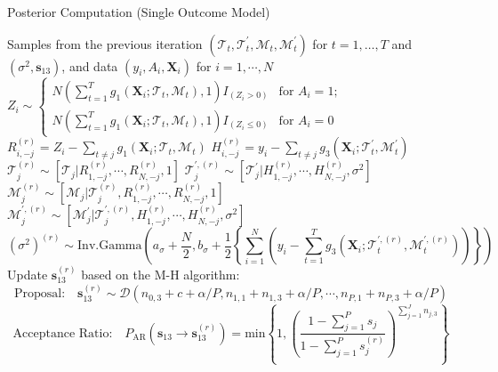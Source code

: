  \begin{algorithm}
\caption{Posterior Computation (Single Outcome Model)}\label{alg:single}
\begin{algorithmic}[1]
\Require Samples from the previous iteration $(\mathcal{T}_t, \mathcal{T}^\prime_t,\mathcal{M}_t,\mathcal{M}_t^\prime)$ for $t=1, \ldots, T$ and $(\sigma^2, \boldsymbol{s}_{13})$, and data $(y_i, A_i, \boldsymbol{X}_i)$ for $i=1, \cdots, N$
\State $Z_i \sim \left\{ \begin{array}{ll}
         N\left(\sum_{t=1}^T g_1(\boldsymbol{X}_i; \mathcal{T}_t, \mathcal{M}_t), 1\right)I_{(Z_i  > 0)} & \mbox{for $A_i =1 $};\\
        N\left(\sum_{t=1}^T g_1(\boldsymbol{X}_i; \mathcal{T}_t, \mathcal{M}_t), 1\right)I_{(Z_i  \leq 0)} & \mbox{for $A_i = 0 $}\end{array} \right.$ 
\EndFor
{}
\State $R_{i,-j}^{(r)} = Z_i - \sum_{t\neq j} g_1(\boldsymbol{X}_i; \mathcal{T}_t, \mathcal{M}_t)$  
\State $H_{i,-j}^{(r)} = y_i - \sum_{t\neq j} g_3(\boldsymbol{X}_i; \mathcal{T}_t^\prime, \mathcal{M}_t^\prime)$  
\EndFor
\State $\mathcal{T}_j^{(r)} \sim [\mathcal{T}_j | R_{1, -j}^{(r)}, \cdots, R_{N, -j}^{(r)}, 1]$  
\State $\mathcal{T}_j^{\prime,(r)} \sim [\mathcal{T}_j^\prime | H_{1, -j}^{(r)}, \cdots, H_{N, -j}^{(r)}, \sigma^2]$  
\State $\mathcal{M}_j^{(r)} \sim [\mathcal{M}_j | \mathcal{T}_j^{(r)}, R_{1, -j}^{(r)}, \cdots, R_{N, -j}^{(r)}, 1]$
\State $\mathcal{M}_j^{\prime,(r)} \sim [\mathcal{M}_j^\prime | \mathcal{T}_j^{\prime,(r)}, H_{1, -j}^{(r)}, \cdots, H_{N, -j}^{(r)}, \sigma^2]$
\EndFor
\State \[(\sigma^2)^{(r)} \sim \text{Inv.Gamma}\left(a_\sigma+\frac{N}{2}, b_\sigma+\frac{1}{2}\left\{\sum_{i=1}^{N} \left(y_i - \sum_{t=1}^T g_3(\boldsymbol{X}_i; \mathcal{T}_t^{\prime,(r)}, \mathcal{M}_t^{\prime,(r)})\right) \right\}\right)\]
\State Update $\boldsymbol{s}_{13}^{(r)}$ based on the M-H algorithm:
\State \[\text{Proposal:} \quad \boldsymbol{s}_{13}^{(r)} \sim \mathcal{D}\left(n_{0,3} + c + \alpha/P, n_{1,1}+n_{1,3} + \alpha/P, \cdots, n_{P,1}+n_{P,3} + \alpha/P\right)\]
\State \[\text{Acceptance Ratio:} \quad P_\text{AR} (\boldsymbol{s}_{13} \rightarrow \boldsymbol{s}_{13}^{(r)}) = \text{min} \left\{1, \left(\frac{1-\sum_{j=1}^P s_j}{1-\sum_{j=1}^Ps_j^{(r)}}\right)^{\sum_{j=1}^J n_{j,3}}  \right\}\]
\EndFor
\end{algorithmic}
\end{algorithm}


